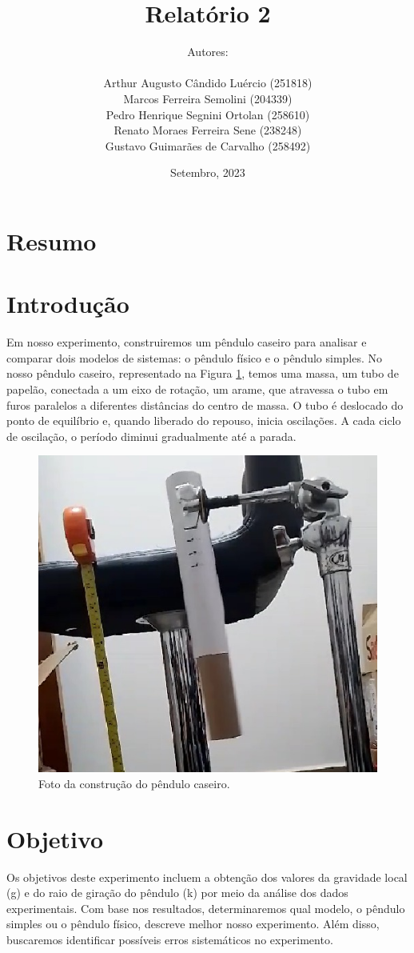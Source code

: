 \documentclass[hidelinks,a4paper,10pt]{article}
\title{\huge
{\textbf{Relatório 2}}
 \\
\fontsize{30pt}{36pt}\selectfont{\textbf{O Pêndulo Físico}}
}
\author{
Autores:\\ \ \\
Arthur Augusto Cândido Luércio (251818) \\
Marcos Ferreira Semolini (204339) \\
Pedro Henrique Segnini Ortolan (258610) \\
Renato Moraes Ferreira Sene (238248) \\
Gustavo Guimarães de Carvalho (258492)
}
\date{Setembro, 2023}
\begin{document}
\pagestyle{fancy}
\fancyfoot{}\fancyhead{}
\maketitle
\pagebreak
{}
\fancyfoot[R]{\thepage}
\section*{Resumo}

\section*{Introdução}

    \qquad Em nosso experimento, construiremos um pêndulo caseiro para analisar e comparar dois modelos de sistemas: o pêndulo físico e o pêndulo simples.
    No nosso pêndulo caseiro, representado na Figura \ref{fig:1.1}, temos uma massa, um tubo de papelão, conectada a um eixo de rotação, um arame, que atravessa o tubo em furos paralelos a diferentes distâncias do centro de massa. O tubo é deslocado do ponto de equilíbrio e, quando liberado do repouso, inicia oscilações. A cada ciclo de oscilação, o período diminui gradualmente até a parada.

    \begin{figure}[h]
        \centering
        \includegraphics[width=0.4\linewidth]{pendulo caseiro.png}
        \caption{\small{Foto da construção do pêndulo caseiro.}}
        \label{fig:1.1}
    \end{figure}

\section*{Objetivo}

    \qquad Os objetivos deste experimento incluem a obtenção dos valores da gravidade local (g) e do raio de giração do pêndulo (k) por meio da análise dos dados experimentais. Com base nos resultados, determinaremos qual modelo, o pêndulo simples ou o pêndulo físico, descreve melhor nosso experimento. Além disso, buscaremos identificar possíveis erros sistemáticos no experimento.
    
\end{document}

